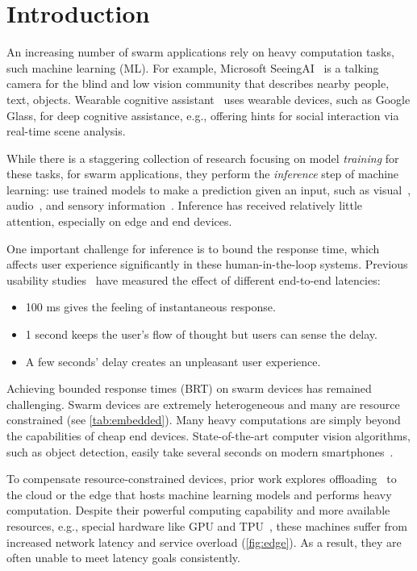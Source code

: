 \section{Introduction}
\label{sec:introduction}

An increasing number of swarm applications rely on heavy computation tasks, such
machine learning (ML). For example, Microsoft SeeingAI~\cite{seeingai} is a
talking camera for the blind and low vision community that describes nearby
people, text, objects. Wearable cognitive assistant~\cite{ha2014towards} uses
wearable devices, such as Google Glass, for deep cognitive assistance, e.g.,
offering hints for social interaction via real-time scene analysis.

While there is a staggering collection of research focusing on model
\textit{training} for these tasks, for swarm applications, they perform the
\textit{inference} step of machine learning: use trained models to make a
prediction given an input, such as visual~\cite{googlelens, ha2014towards,
  seeingai}, audio~\cite{alexa, applesiri, cortana}, and sensory
information~\cite{laput2017synthetic, lu2010jigsaw}. Inference has received
relatively little attention, especially on edge and end devices.

One important challenge for inference is to bound the response time, which
affects user experience significantly in these human-in-the-loop
systems. Previous usability studies~\cite{nielsen1994usability,
  schneiderman1998designing} have measured the effect of different end-to-end
latencies:

\begin{itemize}[noitemsep, topsep=5pt]
\item 100 ms gives the feeling of instantaneous response.
\item 1 second keeps the user's flow of thought but users can sense the delay.
\item A few seconds' delay creates an unpleasant user experience.
\end{itemize}

Achieving bounded response times (BRT) on swarm devices has remained
challenging. Swarm devices are extremely heterogeneous and many are resource
constrained (see \autoref{tab:embedded}). Many heavy computations are simply
beyond the capabilities of cheap end devices. State-of-the-art computer vision
algorithms, such as object detection, easily take several seconds on modern
smartphones~\cite{chen2015glimpse}.

To compensate resource-constrained devices, prior work explores
offloading~\cite{chun2011clonecloud,cuervo2010maui} to the cloud or the edge
that hosts machine learning models and performs heavy computation. Despite their
powerful computing capability and more available resources, e.g., special
hardware like GPU and TPU~\cite{jouppi2017datacenter}, these machines suffer
from increased network latency and service overload (\autoref{fig:edge}). As a
result, they are often unable to meet latency goals consistently.

